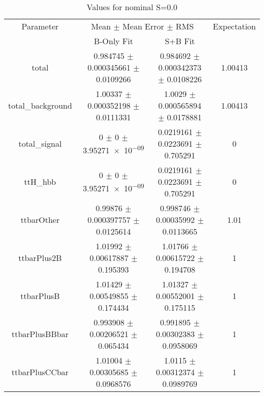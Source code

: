 \begin{table}
\centering
\caption{Values for nominal S=0.0}
\begin{tabular}{cccc}
\toprule
Parameter & \multicolumn{2}{c}{Mean $\pm$ Mean Error $\pm$ RMS} & Expectation\\
 & B-Only Fit & S+B Fit & \\
\midrule
total & \num{0.984745} $\pm$ \num{0.000345661} $\pm$ \num{0.0109266} & \num{0.984692} $\pm$ \num{0.000342373} $\pm$ \num{0.0108226} & \num{1.00413}\\
total\_background & \num{1.00337} $\pm$ \num{0.000352198} $\pm$ \num{0.0111331} & \num{1.0029} $\pm$ \num{0.000565894} $\pm$ \num{0.0178881} & \num{1.00413}\\
total\_signal & \num{0} $\pm$ \num{0} $\pm$ \num{3.95271e-09} & \num{0.0219161} $\pm$ \num{0.0223691} $\pm$ \num{0.705291} & \num{0}\\
ttH\_hbb & \num{0} $\pm$ \num{0} $\pm$ \num{3.95271e-09} & \num{0.0219161} $\pm$ \num{0.0223691} $\pm$ \num{0.705291} & \num{0}\\
ttbarOther & \num{0.99876} $\pm$ \num{0.000397757} $\pm$ \num{0.0125614} & \num{0.998746} $\pm$ \num{0.00035992} $\pm$ \num{0.0113665} & \num{1.01}\\
ttbarPlus2B & \num{1.01992} $\pm$ \num{0.00617887} $\pm$ \num{0.195393} & \num{1.01766} $\pm$ \num{0.00615722} $\pm$ \num{0.194708} & \num{1}\\
ttbarPlusB & \num{1.01429} $\pm$ \num{0.00549855} $\pm$ \num{0.174434} & \num{1.01327} $\pm$ \num{0.00552001} $\pm$ \num{0.175115} & \num{1}\\
ttbarPlusBBbar & \num{0.993908} $\pm$ \num{0.00206521} $\pm$ \num{0.065434} & \num{0.991895} $\pm$ \num{0.00302383} $\pm$ \num{0.0958069} & \num{1}\\
ttbarPlusCCbar & \num{1.01004} $\pm$ \num{0.00305685} $\pm$ \num{0.0968576} & \num{1.0115} $\pm$ \num{0.00312374} $\pm$ \num{0.0989769} & \num{1}\\
\bottomrule
\end{tabular}
\end{table}